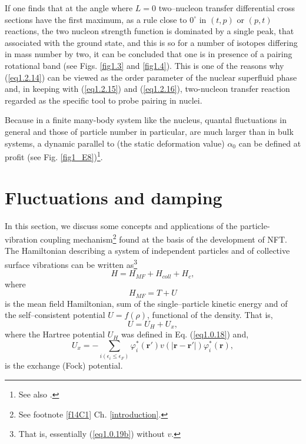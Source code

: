If one finds that at the angle where $L=0$ two--nucleon transfer differential cross sections have the first maximum, as a rule close to $0^\circ$ in $(t,p)$ or $(p,t)$ reactions, the two nucleon strength function is dominated by a single peak, that associated with the ground state, and this is so for a number of isotopes differing in mass number by two, it can be concluded that one is in presence of a pairing rotational band (see Figs. \ref{fig1.3} and \ref{fig1.4}). This is one of the reasons why (\ref{eq1.2.14}) can be viewed as the order parameter of the nuclear superfluid phase and, in keeping with (\ref{eq1.2.15}) and (\ref{eq1.2.16}), two-nucleon transfer reaction regarded as the specific tool to probe pairing in nuclei.

Because in a finite many-body system like the nucleus, quantal fluctuations in general and those of particle number in particular, are much larger than in bulk systems, a dynamic parallel to (the static deformation value) $\alpha_0$ can be defined at profit (see Fig. \ref{fig1_E8})\footnote{See also \cite{Potel:17}.}. 
\section{Fluctuations and damping}\label{appintroD}
In this section, we discuss some concepts and applications of the particle-vibration coupling mechanism\footnote{See footnote \ref{f14C1} Ch. \ref{introduction}.} found at the basis of the development of NFT.
The Hamiltonian describing a system of independent particles and of collective surface vibrations can be written as\footnote{That is, essentially (\ref{eq1.0.19b}) without $v$.} 
\begin{equation}\label{eqn:30}
H = H_{MF}  + H_{coll} + H_{c} ,
\end{equation}
where
\begin{equation}\label{eq1.3.2}
H_{MF}=T+U
\end{equation}
is the mean field Hamiltonian, sum of the single--particle kinetic energy and of the self--consistent potential $U=f(\rho)$, functional of the  density. That is,
\begin{equation}
U=U_H+U_x,
\end{equation}
where the Hartree potential $U_H$ was defined in Eq. (\ref{eq1.0.18}) and,
\begin{equation}\label{eq2.3.4}
U_x=-\sum_{i(\epsilon_i\leq\epsilon_F)}\varphi_i^*(\mathbf r')v(|\mathbf r- \mathbf r'|)\varphi_i^*(\mathbf r),
\end{equation}
is the exchange (Fock) potential. 



